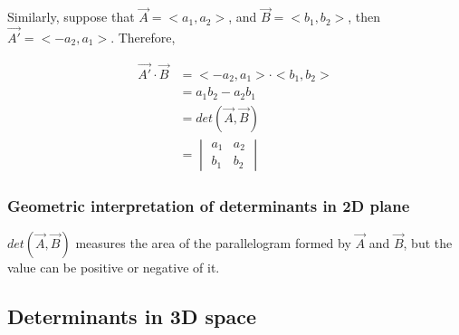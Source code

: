 \documentclass{article}
\begin{document}
Similarly, suppose that $\vec{A} = <a_1, a_2>$, and $\vec{B} = <b_1, b_2>$, then
$\vec{A'} = <-a_2, a_1>$. Therefore,

\[
  \begin{split}
  \vec{A'} \cdot \vec{B}  &= <-a_2, a_1> \cdot <b_1, b_2> \\
                          &= a_1 b_2 - a_2 b_1 \\
                          &= det(\vec{A}, \vec{B}) \\
                          &=  \begin{vmatrix}
                                a_1 & a_2 \\
                                b_1 & b_2
                              \end{vmatrix}
  \end{split}
\]


\subsubsection{Geometric interpretation of determinants in 2D plane}

$det(\vec{A}, \vec{B})$ measures the area of the parallelogram formed by
$\vec{A}$ and $\vec{B}$, but the value can be positive or negative of it.

\subsection{Determinants in 3D space}
\end{document}
